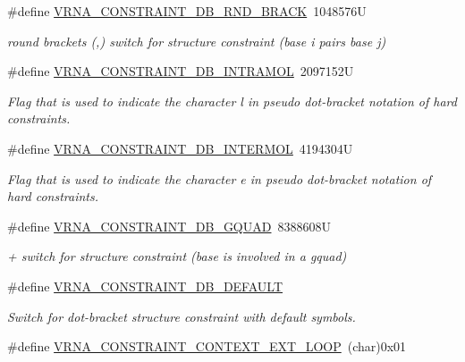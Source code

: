 \begin{DoxyCompactItemize}
\#define \hyperlink{group__hard__constraints_gac17b034852c914bc5879954c65d7e74b}{V\+R\+N\+A\+\_\+\+C\+O\+N\+S\+T\+R\+A\+I\+N\+T\+\_\+\+D\+B\+\_\+\+R\+N\+D\+\_\+\+B\+R\+A\+C\+K}~1048576\+U
\begin{DoxyCompactList}\small\item\em round brackets \textquotesingle{}(\textquotesingle{},\textquotesingle{})\textquotesingle{} switch for structure constraint (base i pairs base j) \end{DoxyCompactList}\item 
\#define \hyperlink{group__hard__constraints_ga5c17253f5a39d1d49b0fb11f5196982a}{V\+R\+N\+A\+\_\+\+C\+O\+N\+S\+T\+R\+A\+I\+N\+T\+\_\+\+D\+B\+\_\+\+I\+N\+T\+R\+A\+M\+O\+L}~2097152\+U
\begin{DoxyCompactList}\small\item\em Flag that is used to indicate the character \textquotesingle{}l\textquotesingle{} in pseudo dot-\/bracket notation of hard constraints. \end{DoxyCompactList}\item 
\#define \hyperlink{group__hard__constraints_ga31d0ebb9755ca8a4acafc14f00ca755d}{V\+R\+N\+A\+\_\+\+C\+O\+N\+S\+T\+R\+A\+I\+N\+T\+\_\+\+D\+B\+\_\+\+I\+N\+T\+E\+R\+M\+O\+L}~4194304\+U
\begin{DoxyCompactList}\small\item\em Flag that is used to indicate the character \textquotesingle{}e\textquotesingle{} in pseudo dot-\/bracket notation of hard constraints. \end{DoxyCompactList}\item 
\#define \hyperlink{group__hard__constraints_ga75cfab03cdc97c95b3ce8bb29f52b08e}{V\+R\+N\+A\+\_\+\+C\+O\+N\+S\+T\+R\+A\+I\+N\+T\+\_\+\+D\+B\+\_\+\+G\+Q\+U\+A\+D}~8388608\+U
\begin{DoxyCompactList}\small\item\em \textquotesingle{}+\textquotesingle{} switch for structure constraint (base is involved in a gquad) \end{DoxyCompactList}\item 
\#define \hyperlink{group__hard__constraints_ga1c3864bdc92147a4d93de2b1b4356177}{V\+R\+N\+A\+\_\+\+C\+O\+N\+S\+T\+R\+A\+I\+N\+T\+\_\+\+D\+B\+\_\+\+D\+E\+F\+A\+U\+L\+T}
\begin{DoxyCompactList}\small\item\em Switch for dot-\/bracket structure constraint with default symbols. \end{DoxyCompactList}\item 
\hypertarget{group__hard__constraints_ga9418eda62a5dec070896702c279d2548}{}\#define \hyperlink{group__hard__constraints_ga9418eda62a5dec070896702c279d2548}{V\+R\+N\+A\+\_\+\+C\+O\+N\+S\+T\+R\+A\+I\+N\+T\+\_\+\+C\+O\+N\+T\+E\+X\+T\+\_\+\+E\+X\+T\+\_\+\+L\+O\+O\+P}~(char)0x01\label{group__hard__constraints_ga9418eda62a5dec070896702c279d2548}


\end{DoxyCompactItemize}
